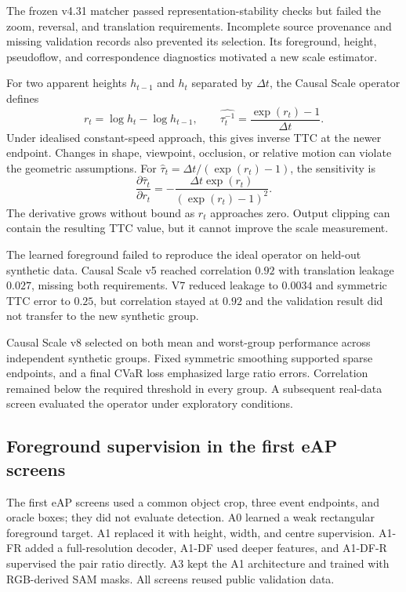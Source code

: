 The frozen v4.31 matcher passed representation-stability checks but failed the zoom, reversal, and translation requirements. Incomplete source provenance and missing validation records also prevented its selection. Its foreground, height, pseudoflow, and correspondence diagnostics motivated a new scale estimator.

For two apparent heights $h_{t-1}$ and $h_t$ separated by $\Delta t$, the Causal Scale operator defines
\begin{equation}
 r_t=\log h_t-\log h_{t-1},\qquad
 \widehat{\tau_t^{-1}}=\frac{\exp(r_t)-1}{\Delta t}.
 \label{eq:early-scale}
\end{equation}
Under idealised constant-speed approach, this gives inverse TTC at the newer endpoint. Changes in shape, viewpoint, occlusion, or relative motion can violate the geometric assumptions. For $\hat\tau_t=\Delta t/(\exp(r_t)-1)$, the sensitivity is
\begin{equation}
 \frac{\partial\hat\tau_t}{\partial r_t}
 =-\frac{\Delta t\exp(r_t)}{(\exp(r_t)-1)^2}.
\end{equation}
The derivative grows without bound as $r_t$ approaches zero. Output clipping can contain the resulting TTC value, but it cannot improve the scale measurement.

The learned foreground failed to reproduce the ideal operator on held-out synthetic data. Causal Scale v5 reached correlation $0.92$ with translation leakage $0.027$, missing both requirements. V7 reduced leakage to $0.0034$ and symmetric TTC error to $0.25$, but correlation stayed at $0.92$ and the validation result did not transfer to the new synthetic group.

Causal Scale v8 selected on both mean and worst-group performance across independent synthetic groups. Fixed symmetric smoothing supported sparse endpoints, and a final CVaR loss emphasized large ratio errors. Correlation remained below the required threshold in every group. A subsequent real-data screen evaluated the operator under exploratory conditions. 

\subsection{Foreground supervision in the first eAP screens}

The first eAP screens used a common object crop, three event endpoints, and oracle boxes; they did not evaluate detection. A0 learned a weak rectangular foreground target. A1 replaced it with height, width, and centre supervision. A1-FR added a full-resolution decoder, A1-DF used deeper features, and A1-DF-R supervised the pair ratio directly. A3 kept the A1 architecture and trained with RGB-derived SAM masks. All screens reused public validation data.

